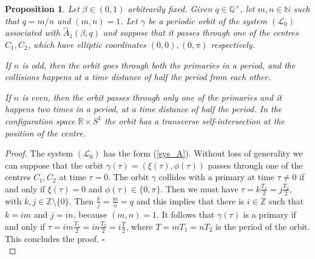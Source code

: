\documentclass[a4paper]{article}
\newtheorem{proposition}{Proposition}
\begin{document}
\begin{proposition}
\label{coll_primaries}
Let $\beta \in (0,1)$ arbitrarily fixed.  Given $q \in {\mathbb{Q}}^+$, let $m,n
\in {\mathbb{N}}$ such that $q=m/n$ and $(m,n)=1$.  Let $\gamma$ be a periodic
orbit of the system $(\mathcal{L}_0)$ associated with
$\hat{A}_1(\beta,q)$ and suppose that it passes through one of the
centres $C_1,C_2$, which have elliptic coordinates $(0,0), (0,\pi)$
respectively.
  
If $n$ is odd, then the orbit goes through both the primaries in a
period, and the collisions happens at a time distance of half the
period from each other.
  
If $n$ is even, then the orbit passes through only one of the
primaries and it happens two times in a period, at a time distance of
half the period.  In the configuration space ${\mathbb{R}} \times S^1$ the orbit
has a transverse self-intersection at the position of the centre.
\end{proposition}
\begin{proof}
The system $(\mathcal{L}_0)$ has the form (\ref{sys_A}).  Without loss
of generality we can suppose that the orbit
$\gamma(\tau)=(\xi(\tau),\phi(\tau))$ passes through one of the
centres $C_1,C_2$ at time $\tau =0$.  The orbit $\gamma$ collides with
a primary at time $\tau \neq 0$ if and only if $\xi(\tau)=0$ and
$\phi(\tau) \in \{0,\pi\}$.  Then we must have $\tau=k\frac{ T_1}{2}=j
\frac{T_2}{2}$, with $k,j \in {\mathbb{Z}}\setminus \{0\}$.  Then
$\frac{k}{j}=\frac{m}{n}=q$ and this implies that there is $i \in {\mathbb{Z}}$
such that $k=im$ and $j=in$, because $(m,n)=1$.  It follows that
$\gamma(\tau)$ is a primary if and only if
$\tau=im\frac{T_1}{2}=in\frac{T_2}{2}=i\frac{T}{2}$, where
$T=mT_1=nT_2$ is the period of the orbit. This concludes the proof.
{$\square$\\}
\end{proof}

    
  
\end{document}
